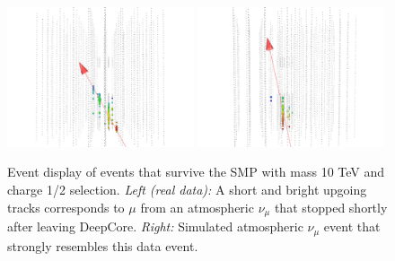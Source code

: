 \begin{appendices}
\begin{figure}
\centering
\includegraphics[width=0.49\textwidth]{appendix/img/FINAL_data_m_10000_ch1ovr2_1.png}
\includegraphics[width=0.49\textwidth]{appendix/img/FINAL_data_m_10000_ch1ovr2_1_NUMUANOLOGY.png}
\caption{Event display of events that survive the SMP with mass 10 TeV and charge 1/2 selection. \textit{Left (real data): } A short and bright upgoing tracks corresponds to $\mu$ from an atmospheric $\nu_\mu$ that stopped shortly after leaving DeepCore. \textit{Right: }Simulated atmospheric $\nu_\mu$ event that strongly resembles this data event.}
\label{fig:final_1}
\end{figure}


\end{appendices}
